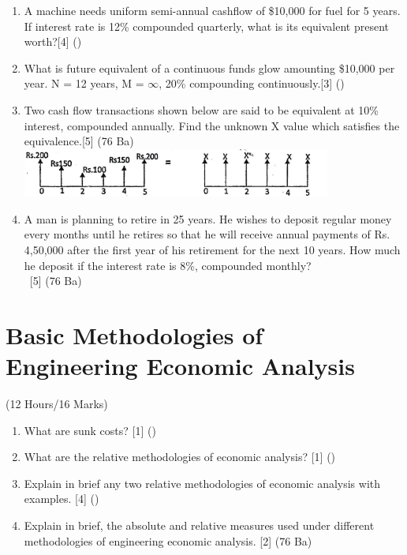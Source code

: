 \documentclass[12pt]{article}
\newcommand{\enter}{\\\textcolor{white}{1}}
\begin{document}
\begin{enumerate}
\item A machine needs uniform semi-annual cashflow of \$10,000 for fuel for 5 years. If interest rate is 12\% compounded quarterly, what is its equivalent present worth?\hfill[4] ()

\item What is future equivalent of a continuous funds glow amounting \$10,000 per year. N = 12 years, M = $\infty$, 20\% compounding continuously.\hfill[3] ()

\item Two cash flow transactions shown below are said to be equivalent at 10\% interest, compounded annually. Find the unknown X value which satisfies the equivalence.\hspace{6mm}[5] (76 Ba)\\
\includegraphics[width=4in]{ee_1}

\item A man is planning to retire in 25 years. He wishes to deposit regular money every months until he retires so that he will receive annual payments of Rs. 4,50,000 after the first year of his retirement for the next 10 years. How much he deposit if the interest rate is 8\%, compounded monthly?
\enter\hfill[5] (76 Ba)
\end{enumerate}

\pagebreak
\section{Basic Methodologies of Engineering Economic Analysis}
\begin{center}(12 Hours/16 Marks)\end{center}
\begin{enumerate}[noitemsep, topsep = 0pt]
	\item What are sunk costs? \hfill [1] ()
	
	\item What are the relative methodologies of economic analysis? \hfill [1] ()
	
	\item Explain in brief any two relative methodologies of economic analysis with examples. \hfill [4] ()
	
	\item Explain in brief, the absolute and relative measures used under different methodologies of engineering economic analysis. \hspace{10.4cm} [2] (76 Ba)
	
\end{enumerate}
\end{document}
